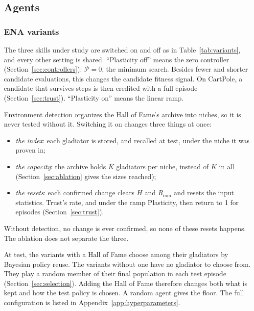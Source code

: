 \subsection{Agents}

\subsubsection{ENA variants}
\label{sec:variants}
The three skills under study are switched on and off as in Table~\ref{tab:variants}, and every other setting is shared. ``Plasticity off'' means the zero controller (Section~\ref{sec:controllers}): $\mathcal{P} = 0$, the minimum search. Besides fewer and shorter candidate evaluations, this changes the candidate fitness signal. On CartPole, a candidate that survives  steps is then credited with a full episode (Section~\ref{sec:trust}). ``Plasticity on'' means the linear ramp.

Environment detection organizes the Hall of Fame's archive into niches, so it is never tested without it. Switching it on changes three things at once:
\begin{itemize}
\item \textit{the index}: each gladiator is stored, and recalled at test, under the niche it was proven in;
\item \textit{the capacity}: the archive holds $K$ gladiators per niche, instead of $K$ in all (Section~\ref{sec:ablation} gives the sizes reached);
\item \textit{the resets}: each confirmed change clears $H$ and $R_{\min}$ and resets the input statistics. Trust's rate, and under the ramp Plasticity, then return to 1 for  episodes (Section~\ref{sec:trust}).
\end{itemize}
Without detection, no change is ever confirmed, so none of these resets happens. The ablation does not separate the three.

At test, the variants with a Hall of Fame choose among their gladiators by Bayesian policy reuse. The variants without one have no gladiator to choose from. They play a random member of their final population in each test episode (Section~\ref{sec:selection}). Adding the Hall of Fame therefore changes both what is kept and how the test policy is chosen. A random agent gives the floor. The full configuration is listed in Appendix~\ref{app:hyperparameters}.

